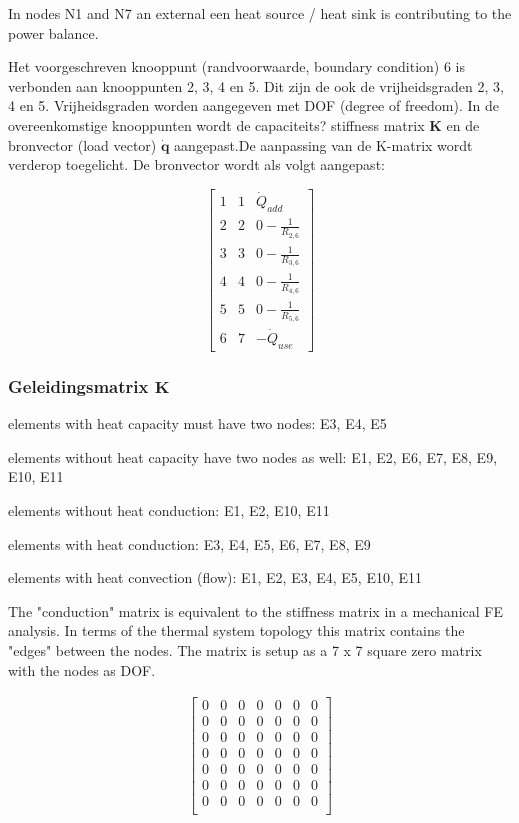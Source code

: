 In nodes N1 and N7 an external een heat source / heat sink is contributing to the power balance.

Het voorgeschreven knooppunt (randvoorwaarde, boundary condition) 6 is verbonden aan knooppunten 2, 3, 4 en 5. Dit zijn de ook de vrijheidsgraden 2, 3, 4 en 5. Vrijheidsgraden worden aangegeven met DOF (degree of freedom). In de overeenkomstige knooppunten wordt de capaciteits? stiffness matrix $\mathbf{K}$ en de bronvector (load vector) $\mathbf{\dot{q}}$ aangepast.De aanpassing van de K-matrix wordt verderop toegelicht. De bronvector wordt als volgt aangepast:

\[
\begin{bmatrix}
	1 & 1 & \dot{Q}_{add} \\
	2 & 2 & 0 - \frac{1}{R_{2,6}} \\
	3 & 3 & 0 - \frac{1}{R_{3,6}} \\
	4 & 4 & 0 - \frac{1}{R_{4,6}} \\
	5 & 5 & 0 - \frac{1}{R_{5,6}} \\
	6 & 7 & -\dot{Q}_{use}
\end{bmatrix}
\]


\subsubsection{Geleidingsmatrix $\mathbf{K}$}

elements with heat capacity must have two nodes:
E3, E4, E5

elements without heat capacity have two nodes as well:
E1, E2, E6, E7, E8, E9, E10, E11

elements without heat conduction:
E1, E2, E10, E11

elements with heat conduction:
E3, E4, E5, E6, E7, E8, E9

elements with heat convection (flow):
E1, E2, E3, E4, E5, E10, E11

The "conduction" matrix is equivalent to the stiffness matrix in a mechanical FE analysis.
In terms of the thermal system topology this matrix contains the "edges" between the nodes. The matrix is setup as a 7 x 7 square zero matrix with the nodes as DOF.

\begin{equation}
	\begin{aligned}
		\begin{bmatrix}
			0 & 0 & 0 & 0 & 0 & 0 & 0\\
			0 & 0 & 0 & 0 & 0 & 0 & 0\\
			0 & 0 & 0 & 0 & 0 & 0 & 0\\
			0 & 0 & 0 & 0 & 0 & 0 & 0\\
			0 & 0 & 0 & 0 & 0 & 0 & 0\\
			0 & 0 & 0 & 0 & 0 & 0 & 0\\
			0 & 0 & 0 & 0 & 0 & 0 & 0\\
		\end{bmatrix}
	\end{aligned}
\end{equation}

